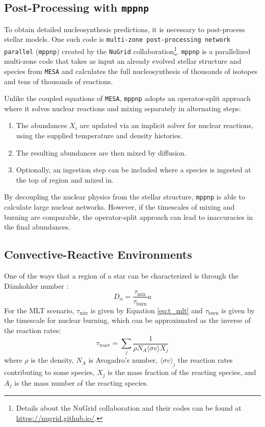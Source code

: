 \subsection{Post-Processing with \texttt{mppnp}}

To obtain detailed nucleosynthesis predictions, it is necessary to post-process stellar models.
One such code is \texttt{multi-zone post-processing network parallel} (\texttt{mppnp}) created by the \texttt{NuGrid} collaboration\footnote{Details about the NuGrid collaboration and their codes can be found at \url{https://nugrid.github.io/}.}.
\texttt{mppnp} is a parallelized multi-zone code that takes as input an already evolved stellar structure and species from \texttt{MESA} and calculates the full nucleosynthesis of thousands of isotopes and tens of thousands of reactions.

Unlike the coupled equations of \texttt{MESA}, \texttt{mppnp} adopts an operator-split approach where it solves nuclear reactions and mixing separately in alternating steps:

\begin{enumerate}
\item The abundances $X_i$ are updated via an implicit solver for nuclear reactions, using the supplied temperature and density histories.
\item The resulting abundances are then mixed by diffusion.
\item Optionally, an ingestion step can be included where a species is ingested at the top of region and mixed in.
\end{enumerate}

By decoupling the nuclear physics from the stellar structure, \texttt{mppnp} is able to calculate large nuclear networks.
However, if the timescales of mixing and burning are comparable, the operator-split approach can lead to inaccuracies in the final abundances.

\subsection{Convective-Reactive Environments}\label{sec:convective_reactive_env}

One of the ways that a region of a star can be characterized is through the Dämkohler number \citep{dimotakisTurbulentMixing2005}:
\begin{equation}
D_\alpha = \frac{\tau_{\mathrm{mix}}}{\tau_{\mathrm{burn}}}a
\end{equation}
For the MLT scenario, $\tau_{\mathrm{mix}}$ is given by Equation \ref{eq:t_mlt} and $\tau_{\mathrm{burn}}$ is given by the timescale for nuclear burning, which can be approximated as the inverse of the reaction rates:
\begin{equation}
    \tau_{\mathrm{react}} = \sum_j \frac{1}{\rho N_A \langle \sigma v \rangle X_j}
\end{equation}
where $\rho$ is the density, $N_A$ is Avogadro's number, $\langle \sigma v \rangle_j$ the reaction rates contributing to some species, $X_j$ is the mass fraction of the reacting species, and $A_j$ is the mass number of the reacting species.

